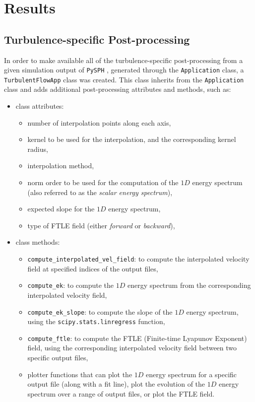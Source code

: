 
\chapter{Results}
\label{chap:results}

\section{Turbulence-specific Post-processing}

In order to make available all of the turbulence-specific post-processing from a given simulation output of \texttt{PySPH} \parencite{ramachandran2021a}, generated through the \texttt{Application} class, a \texttt{TurbulentFlowApp} class was created. This class inherits from the \texttt{Application} class and adds additional post-processing attributes and methods, such as:

\begin{itemize}
	\item class attributes:
	\begin{itemize}
		\item number of interpolation points along each axis,
		\item kernel to be used for the interpolation, and the corresponding kernel radius,
		\item interpolation method,
		\item norm order to be used for the computation of the $1D$ energy spectrum (also referred to as the \textit{scalar energy spectrum}),
		\item expected slope for the $1D$ energy spectrum,
        \item type of FTLE field (either \textit{forward} or \textit{backward}),
	\end{itemize}
	
	\item class methods:
	\begin{itemize}
		\item \texttt{compute\_interpolated\_vel\_field}: to compute the interpolated velocity field at specified indices of the output files,
        \item \texttt{compute\_ek}: to compute the $1D$ energy spectrum from the corresponding interpolated velocity field,
        \item \texttt{compute\_ek\_slope}: to compute the slope of the $1D$ energy spectrum, using the \texttt{scipy.stats.linregress} function,
        \item \texttt{compute\_ftle}: to compute the FTLE (Finite-time Lyapunov Exponent) field, using the corresponding interpolated velocity field between two specific output files,
        \item plotter functions that can plot the $1D$ energy spectrum for a specific output file (along with a fit line), plot the evolution of the $1D$ energy spectrum over a range of output files, or plot the FTLE field.
	\end{itemize}
\end{itemize}

